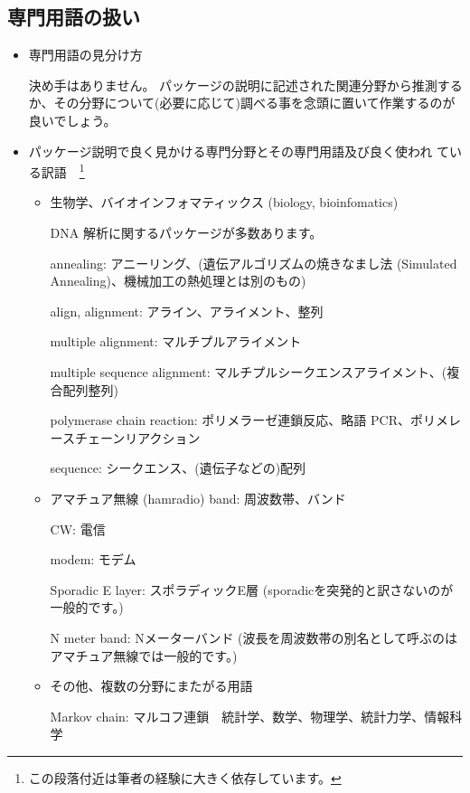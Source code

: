 \documentclass[mingoth,a4paper]{jsarticle}
\begin{document}
\subsection{専門用語の扱い}
\begin{itemize}
 \item{専門用語の見分け方

決め手はありません。
パッケージの説明に記述された関連分野から推測するか、その分野について(必要に応じて)調べる事を念頭に置いて作業するのが良いでしょう。}

 \item{パッケージ説明で良く見かける専門分野とその専門用語及び良く使われ
      ている訳語}　\footnote{ この段落付近は筆者の経験に大きく依存しています。}
 \begin{itemize}

  \item 生物学、バイオインフォマティックス (biology, bioinfomatics)

        DNA 解析に関するパッケージが多数あります。

	annealing: アニーリング、(遺伝アルゴリズムの焼きなまし法
	(Simulated Annealing)、機械加工の熱処理とは別のもの)

	align, alignment: アライン、アライメント、整列

	multiple alignment: マルチプルアライメント

	multiple sequence alignment: マルチプルシークエンスアライメント、(複合配列整列)

	polymerase chain reaction: ポリメラーゼ連鎖反応、略語 PCR、ポリメレースチェーンリアクション

	sequence: シークエンス、(遺伝子などの)配列


  \item アマチュア無線 (hamradio)
	band: 周波数帯、バンド

	CW: 電信

	modem: モデム

	Sporadic E layer: スポラディックE層 (sporadicを突発的と訳さないのが一般的です。)

	N meter band: Nメーターバンド (波長を周波数帯の別名として呼ぶのはアマチュア無線では一般的です。)


  \item その他、複数の分野にまたがる用語

	Markov chain: マルコフ連鎖　統計学、数学、物理学、統計力学、情報科学

  \end{itemize}

\end{itemize}
\end{document}
